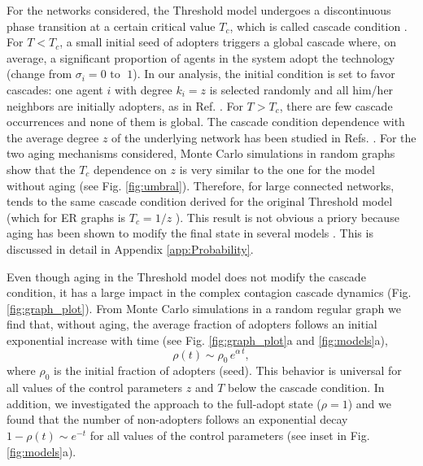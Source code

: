 For the networks considered, the Threshold model undergoes a discontinuous phase transition at a certain critical value $T_{c}$, which is called cascade condition \cite{watts-2002}. For $T<T_c$, a small initial seed of adopters triggers a global cascade where, on average, a significant proportion of agents in the system adopt the technology (change from $\sigma_i = 0 \mbox{ to } \; 1$). In our analysis, the initial condition is set to favor cascades: one agent $i$ with degree $k_i = z$ is selected randomly and all him/her neighbors are initially adopters, as in Ref. \cite{centola-2007,singh-2013}. For $T>T_c$, there are few cascade occurrences and none of them is global. The cascade condition dependence with the average degree $z$ of the underlying network has been studied in Refs. \cite{watts-2002, gleeson-2007}. For the two aging mechanisms considered, Monte Carlo simulations in random graphs show that the $T_c$ dependence on $z$ is very similar to the one for the model without aging (see Fig. \ref{fig:umbral}). Therefore, for large connected networks, tends to the same cascade condition derived for the original Threshold model (which for ER graphs is $T_{c} = 1 / z$ \cite{watts-2002}). This result is not obvious a priory because aging has been shown to modify the final state in several models \cite{fernandez-gracia-2013,artime-2018,peralta-2020C,peralta-2020A,chen-2020,fernandez-gracia-2011,perez-2016,stark-2008,Abella}. This is discussed in detail in Appendix \ref{app:Probability}. 

Even though aging in the Threshold model does not modify the cascade condition, it has a large impact in the complex contagion cascade dynamics (Fig.\ref{fig:graph_plot}). 
From Monte Carlo simulations in a random regular graph we find that, without aging,  the average fraction of adopters follows an initial exponential increase with time (see Fig. \ref{fig:graph_plot}a and \ref{fig:models}a), 
\begin{equation}
\rho(t) \sim \rho_0 \, e^{\alpha \, t},
\label{eq:exponential}
\end{equation}
where $\rho_0$ is the initial fraction of adopters (seed). This behavior is universal for all values of the control parameters $z$ and $T$ below the cascade condition. In addition, we investigated the approach to the full-adopt state ($\rho = 1$) and we found that the number of non-adopters follows an exponential decay $1 - \rho(t) \sim e^{-t}$ for all values of the control parameters (see inset in Fig.\ref{fig:models}a).

